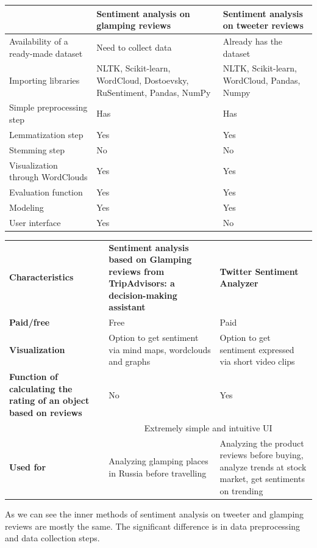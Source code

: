 \documentclass{article}
\begin{document}
\begin{tabular}{|m{2cm}|b{4cm}|p{4cm}|}
\hline
 & Sentiment analysis on glamping reviews & Sentiment analysis 
 on tweeter reviews\cite{philander2016twitter} \\ \hline
 Availability of a ready-made dataset & Need to collect data & Already has the dataset \\ \hline
 Importing libraries & NLTK, Scikit-learn, WordCloud, Dostoevsky, RuSentiment, Pandas, NumPy & NLTK, Scikit-learn, WordCloud, Pandas, Numpy \\ \hline
 Simple preprocessing step & Has & Has \\ \hline
 Lemmatization step & Yes & Yes \\ \hline
 Stemming step & No & No \\ \hline
 Visualization through WordClouds & Yes & Yes \\ \hline
 Evaluation function & Yes & Yes \\ \hline
 Modeling & Yes & Yes \\ \hline
 User interface & Yes & No \\ \hline
\hline
\end{tabular} 
\newline\newline

\begin{tabular}{m{4cm} m{3cm} m{3cm}}
    \textbf{Characteristics} &  \textbf{Sentiment analysis based on Glamping reviews from TripAdvisors: a decision-making assistant} & \textbf{Twitter Sentiment Analyzer}\cite{ahmad2022urdu}\\ 
    \textbf{Paid/free} & Free & Paid \\ \hline
    \textbf{Visualization} & Option to get sentiment via mind maps, wordclouds and graphs & Option to get sentiment expressed via short video clips \\ \hline 
    \textbf{Function of calculating the rating of an object based on reviews} & No & Yes \\ \hline
    & \multicolumn{2}{|c|}{Extremely simple and intuitive UI} \\ \hline
    \textbf{Used for} & Analyzing glamping places in Russia before travelling & Analyzing the product reviews before buying, analyze trends at stock market, get sentiments on trending \\ 
\end{tabular}
\newline\newline
As we can see the inner methods of sentiment analysis on tweeter and glamping reviews are mostly the same. The significant difference is in data preprocessing and data collection steps.\cite{patel2020sentiment}
\end{document}
